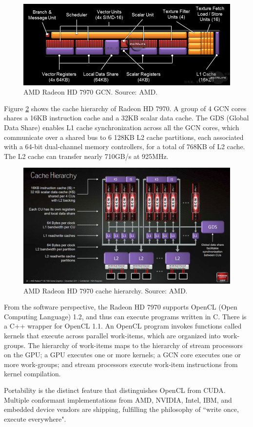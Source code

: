\begin{figure}
\centering
\includegraphics[width=\textwidth]{GPU/RadeonHD7970GCN.png}
\caption{AMD Radeon HD 7970 GCN. Source: AMD.}
\label{GPU:RadeonHD7970GCN}
\end{figure}

Figure \ref{GPU:RadeonHD7970CacheHierarchy} shows the cache hierarchy of Radeon HD 7970. A group of 4 GCN cores shares a 16KB instruction cache and a 32KB scalar data cache. The GDS (Global Data Share) enables L1 cache synchronization across all the GCN cores, which communicate over a shared bus to 6 128KB L2 cache partitions, each associated with a 64-bit dual-channel memory controllers, for a total of 768KB of L2 cache. The L2 cache can transfer nearly 710GB/s at 925MHz.

\begin{figure}
\centering
\includegraphics[width=\textwidth]{GPU/RadeonHD7970CacheHierarchy.jpg}
\caption{AMD Radeon HD 7970 cache hierarchy. Source: AMD.}
\label{GPU:RadeonHD7970CacheHierarchy}
\end{figure}

From the software perspective, the Radeon HD 7970 supports OpenCL (Open Computing Language) 1.2, and thus can execute programs written in C. There is a C++ wrapper for OpenCL 1.1. An OpenCL program invokes functions called kernels that execute across parallel work-items, which are organized into work-groups. The hierarchy of work-items maps to the hierarchy of stream processors on the GPU; a GPU executes one or more kernels; a GCN core executes one or more work-groups; and stream processors execute work-item instructions from kernel compilation.

Portability is the distinct feature that distinguishes OpenCL from CUDA. Multiple conformant implementations from AMD, NVIDIA, Intel, IBM, and embedded device vendors are shipping, fulfilling the philosophy of ``write once, execute everywhere".

\chapterend
